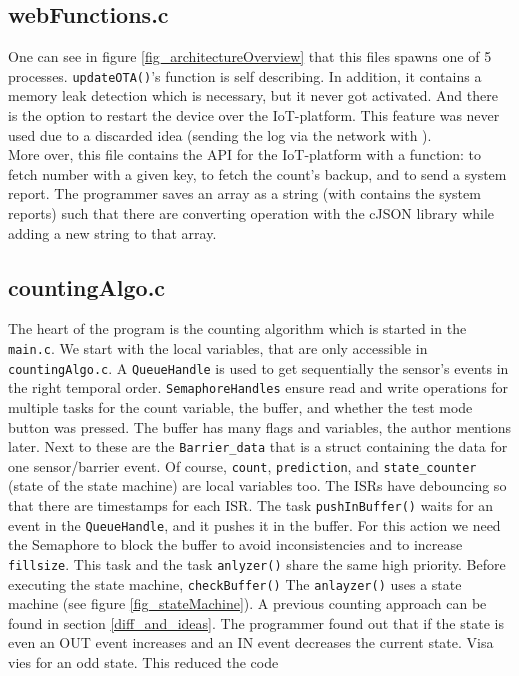 \subsection{webFunctions.c}
One can see in figure \ref{fig_architectureOverview} that this files spawns one of 5 processes.
\verb!updateOTA()!'s function is self describing. In addition, it contains a memory leak detection
which is necessary, but it never got activated. And there is the option to restart the device
over the IoT-platform. This feature was never used due to a discarded idea (sending the log
via the network with \cite{gitSendLog}).\\
More over, this file contains the API for the IoT-platform with a function: to fetch number with a
given key, to fetch the count's backup, and to send a system report. The programmer saves an array
as a string (with contains the system reports)
such that there are converting operation with the cJSON library while adding a new
string to that array.


\subsection{countingAlgo.c}
The heart of the program is the counting algorithm which is started in the \verb!main.c!.
We start with the local variables, that are only accessible in \verb!countingAlgo.c!. A \verb!QueueHandle! is
used to get sequentially the sensor's events in the right temporal order.
\verb!SemaphoreHandles! ensure read and write operations for multiple tasks for the count variable,
the buffer, and whether the test mode button was pressed. The buffer has many flags and variables, the author mentions
later. Next to these are the \verb!Barrier_data!
that is a struct containing the data for one sensor/barrier event. Of course, \verb!count!,
\verb!prediction!, and \verb!state_counter! (state of the state machine) are local variables too.
The ISRs have debouncing so that there are timestamps for each ISR.
The task \verb!pushInBuffer()! waits for an event in the \verb!QueueHandle!, and it pushes it in the buffer.
For this action we need the Semaphore to block the buffer to avoid inconsistencies and
to increase \verb!fillsize!.
This task and the task \verb!anlyzer()! share the same high priority.
Before executing the state machine, \verb!checkBuffer()!
The \verb!anlayzer()! uses a state
machine (see figure \ref{fig_stateMachine}). A previous counting approach can be found in section \ref{diff_and_ideas}.
The programmer found out that if the state is even an OUT event increases and an IN event decreases the current
state. Visa vies for an odd state. This reduced the code

